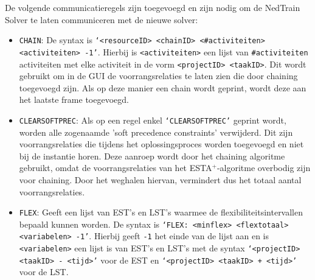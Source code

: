 De volgende communicatieregels zijn toegevoegd en zijn nodig om de NedTrain Solver te laten communiceren met de nieuwe solver:
\begin{itemize}
    \item \texttt{CHAIN}: De syntax is \texttt{\textquoteleft <resourceID> <chainID> <\#activiteiten> <activiteiten> -1\textquoteright}. Hierbij is \texttt{<activiteiten>} een lijst van \texttt{\#activiteiten} activiteiten met elke activiteit in de vorm \texttt{<projectID> <taakID>}. Dit wordt gebruikt om in de GUI de voorrangsrelaties te laten zien die door chaining toegevoegd zijn. Als op deze manier een chain wordt geprint, wordt deze aan het laatste frame toegevoegd.
    \item \texttt{CLEARSOFTPREC}: Als op een regel enkel \texttt{\textquoteleft CLEARSOFTPREC\textquoteright} geprint wordt, worden alle zogenaamde 'soft precedence constraints' verwijderd. Dit zijn voorrangsrelaties die tijdens het oplossingsproces worden toegevoegd en niet bij de instantie horen. Deze aanroep wordt door het chaining algoritme gebruikt, omdat de voorrangsrelaties van het ESTA$^+$-algoritme overbodig zijn voor chaining. Door het weghalen hiervan, vermindert dus het totaal aantal voorrangsrelaties.
    \item \texttt{FLEX}: Geeft een lijst van EST's en LST's waarmee de flexibiliteitsintervallen bepaald kunnen worden. De syntax is \texttt{\textquoteleft FLEX: <minflex> <flextotaal> <variabelen> -1\textquoteright}. Hierbij geeft \texttt{-1} het einde van de lijst aan en is \texttt{<variabelen>} een lijst is van EST's en LST's met de syntax \texttt{\textquoteleft <projectID> <taakID> - <tijd>\textquoteright} voor de EST en \texttt{\textquoteleft <projectID> <taakID> + <tijd>\textquoteright} voor de LST.
\end{itemize}
